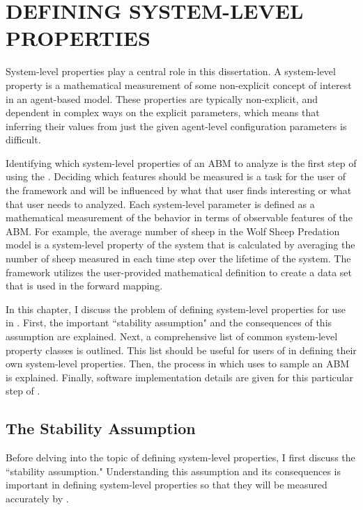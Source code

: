 \chapter{DEFINING SYSTEM-LEVEL PROPERTIES}
\thispagestyle{plain}

\label{Defining}

System-level properties play a central role in this dissertation.
A system-level property is a mathematical measurement of some non-explicit concept of interest in an agent-based model.
These properties are typically non-explicit, and dependent in complex ways on the explicit parameters, which means that inferring their values from just the given agent-level configuration parameters is difficult.

Identifying which system-level properties of an ABM to analyze is the first step of using the \framework.
Deciding which features should be measured is a task for the user of the framework and will be influenced by what that user finds interesting or what that user needs to analyzed.
Each system-level parameter is defined as a mathematical measurement of the behavior in terms of observable features of the ABM.
For example, the average number of sheep in the Wolf Sheep Predation model is a system-level property of the system that is calculated by averaging the number of sheep measured in each time step over the lifetime of the system.
The framework utilizes the user-provided mathematical definition to create a data set that is used in the forward mapping.

In this chapter, I discuss the problem of defining system-level properties for use in \fw.
First, the important ``stability assumption" and the consequences of this assumption are explained.
Next, a comprehensive list of common system-level property classes is outlined.
This list should be useful for users of \fw in defining their own system-level properties.
Then, the process in which \fw uses to sample an ABM is explained.
Finally, software implementation details are given for this particular step of \fw.


\section{The Stability Assumption}

Before delving into the topic of defining system-level properties, I first discuss the ``stability assumption."
Understanding this assumption and its consequences is important in defining system-level properties so that they will be measured accurately by \fw.

